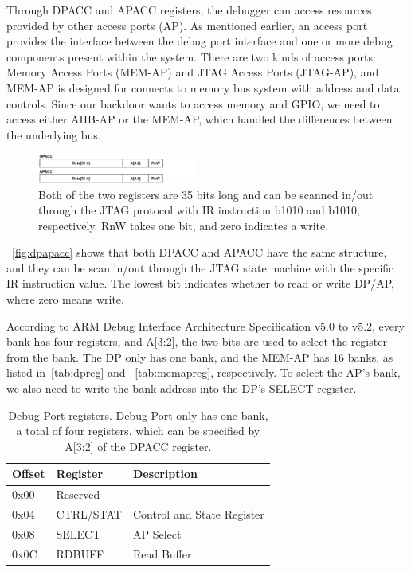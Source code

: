 Through DPACC and APACC registers, the debugger can access resources provided by other access ports (AP).  As mentioned earlier, an access port provides the interface between the debug port interface and one or more debug components present within the system. There are two kinds of access ports: Memory Access Ports (MEM-AP) and JTAG Access Ports (JTAG-AP), and MEM-AP is designed for connects to memory bus system with address and data controls.  Since our backdoor wants to access memory and GPIO, we need to access either AHB-AP or the MEM-AP, which handled the differences between the underlying bus.



\begin{figure}[ht]
	\includegraphics[width=0.47\textwidth]{figures/dpapacc}
	\centering
	\caption{Both of the two registers are 35 bits long and can be scanned in/out through the JTAG protocol with IR instruction b1010 and b1010, respectively. RnW takes one bit, and zero indicates a write.}
	\label{fig:dpapacc}
\end{figure}


~\autoref{fig:dpapacc} shows that both DPACC and APACC have the same structure, and they can be scan in/out through the JTAG state machine with the specific IR instruction value. The lowest bit indicates whether to read or write DP/AP, where zero means write.

 According to ARM Debug Interface Architecture Specification v5.0 to v5.2, every bank has four registers, and A[3:2], the two bits are used to select the register from the bank. The DP only has one bank, and the MEM-AP has 16 banks, as listed in~\autoref{tab:dpreg} and ~\autoref{tab:memapreg}, respectively. To select the AP's bank, we also need to write the bank address into the DP's SELECT register.




\begin{center}
	\begin{table}
		\begin{tabular}{l l l} 
			\hline
			Offset & Register &  Description  \\ 
			\hline
			0x00 & \multicolumn{2}{l}{Reserved} \\
			\hline
			0x04 & CTRL/STAT & Control and State Register \\
			\hline
			0x08 & SELECT & AP Select \\
			\hline
			0x0C & RDBUFF & Read Buffer\\
			\hline
		\end{tabular}
		\caption{Debug Port registers. Debug Port only has one bank, a total of four registers, which can be specified by A[3:2] of the DPACC register. }
		\label{tab:dpreg}
	\end{table}
\end{center}

